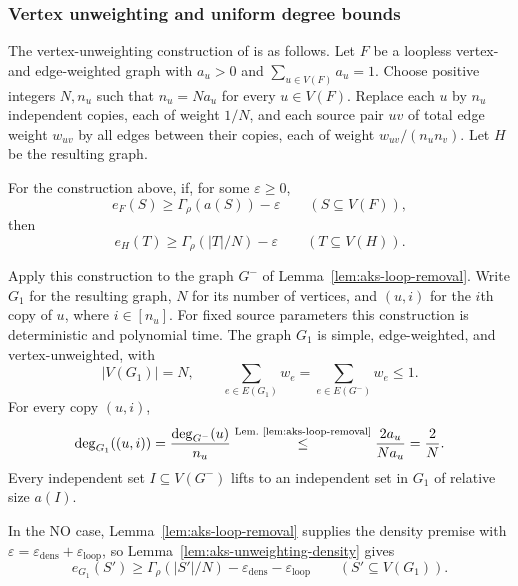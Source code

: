 \subsubsection{Vertex unweighting and uniform degree bounds}

The vertex-unweighting construction of
\cite[Section~4, Step~1]{AKS2011} is as follows.
Let $F$ be a loopless vertex- and edge-weighted graph with
$a_u>0$ and $\sum_{u\in V(F)}a_u=1$. Choose positive integers
$N,n_u$ such that $n_u=Na_u$ for every $u\in V(F)$.
Replace each $u$ by $n_u$ independent copies, each of weight $1/N$,
and each source pair $uv$ of total edge weight $w_{uv}$ by all
edges between their copies, each of weight $w_{uv}/(n_un_v)$.
Let $H$ be the resulting graph.

\begin{lemma}
\label{lem:aks-unweighting-density}
For the construction above, if, for some $\varepsilon\ge0$,
\[
 e_F(S)\ge\Gamma_\rho(a(S))-\varepsilon
 \qquad(S\subseteq V(F)),
\]
then
\[
 e_H(T)\ge\Gamma_\rho(|T|/N)-\varepsilon
 \qquad(T\subseteq V(H)).
\]
\end{lemma}

Apply this construction to the graph $G^-$ of
Lemma~\ref{lem:aks-loop-removal}.
Write $G_1$ for the resulting graph, $N$ for its number of vertices,
and $(u,i)$ for the $i$th copy of $u$, where $i\in[n_u]$.
For fixed source parameters this construction is deterministic
and polynomial time.
The graph $G_1$ is simple, edge-weighted, and vertex-unweighted, with
\[
 |V(G_1)|=N,\qquad
 \sum_{e\in E(G_1)}w_e=\sum_{e\in E(G^-)}w_e\le1.
\]
For every copy $(u,i)$,
\begin{equation}\label{eq:aks-unweighting-degree}
 \deg_{G_1}((u,i))=\frac{\deg_{G^-}(u)}{n_u}
 \overset{\text{Lem.~\ref{lem:aks-loop-removal}}}{\leq}
 \frac{2a_u}{Na_u}=\frac2N.
\end{equation}
Every independent set $I\subseteq V(G^-)$ lifts to an independent
set in $G_1$ of relative size $a(I)$.

In the NO case, Lemma~\ref{lem:aks-loop-removal} supplies the density
premise with $\varepsilon=\varepsilon_{\mathrm{dens}}+\varepsilon_{\mathrm{loop}}$,
so Lemma~\ref{lem:aks-unweighting-density} gives
\begin{equation}\label{eq:aks-unweighting-density}
 e_{G_1}(S')\ge\Gamma_\rho(|S'|/N)
 -\varepsilon_{\mathrm{dens}}-\varepsilon_{\mathrm{loop}}
 \qquad(S'\subseteq V(G_1)).
\end{equation}


